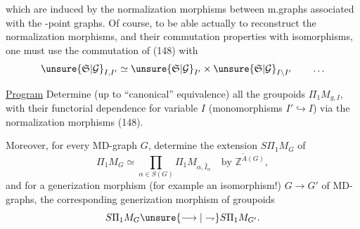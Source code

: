 which are induced by the normalization morphisms between m.graphs associated with the -point graphs. Of course, to be able actually to reconstruct the  normalization morphisms, and their commutation properties with isomorphisms, one must use the  commutation of (148) with
\[
\unsure{\mathfrak S|\mathcal G}_{I,I'}\simeq\unsure{\mathfrak S|\mathcal G}_{I'}\times\unsure{\mathfrak S|\mathcal G}_{I\setminus I'}\qquad\ldots
\]

\uline{Program} Determine (up to ``canonical'' equivalence) all the groupoids $\Pi_1M_{g,I}$, with their functorial dependence for  variable $I$ (monomorphisms $I'\hookrightarrow I$) via the normalization morphisms (148).

Moreover, for every MD-graph $G$, determine the extension $S\Pi_1M_G$ of
\[
\Pi_1M_G\simeq\prod_{\alpha\in S(G)}\Pi_1M_{\alpha,\widehat I_\alpha}\quad\text{by }\mathbb Z^{\widetilde A(G)},
\]
and for a generization morphism (for example an isomorphism!)  $G\longrightarrow G'$ of MD-graphs,  the corresponding generization morphism of groupoids
\[
S\Pi_1M_G\unsure{\longrightarrow|\rightharpoondown}S\Pi_1M_{G'}.
\]
